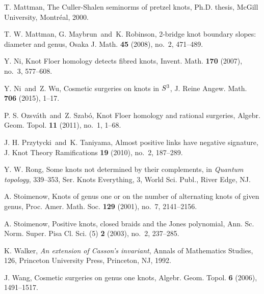 \documentclass{amsart}
\theoremstyle{remark}
\theoremstyle{definition}
\begin{document}
\begin{thebibliography}{99}
T. Mattman,
The Culler-Shalen seminorms of pretzel knots, 
Ph.D. thesis, McGill University, Montr\'eal, 2000.

T. W. Mattman, G. Maybrun\ and\ K. Robinson, 
2-bridge knot boundary slopes: diameter and genus, 
Osaka J. Math. {\bf 45} (2008), no.~2, 471--489. 


Y. Ni, 
Knot Floer homology detects fibred knots, 
Invent. Math. {\bf 170} (2007), no.~3, 577--608. 

Y. Ni\ and\ Z. Wu, 
Cosmetic surgeries on knots in $S\sp 3$, 
J. Reine Angew. Math. {\bf 706} (2015), 1--17. 

P. S. Ozsv\'{a}th\ and\ Z. Szab\'{o}, 
Knot Floer homology and rational surgeries, 
Algebr. Geom. Topol. {\bf 11} (2011), no.~1, 1--68.


J. H. Przytycki\ and\ K. Taniyama, 
Almost positive links have negative signature, 
J. Knot Theory Ramifications {\bf 19} (2010), no.~2, 187--289. 

Y. W. Rong, 
Some knots not determined by their complements, 
in {\it Quantum topology}, 339--353, 
Ser. Knots Everything, 3, World Sci. Publ., River Edge, NJ. 

A. Stoimenow, 
Knots of genus one or on the number of alternating knots of given genus, 
Proc. Amer. Math. Soc. {\bf 129} (2001), no.~7, 2141--2156. 

A. Stoimenow, 
Positive knots, closed braids and the Jones polynomial, 
Ann. Sc. Norm. Super. Pisa Cl. Sci. (5) {\bf 2} (2003), no.~2, 237--285. 

K. Walker, 
{\it An extension of Casson's invariant}, 
Annals of Mathematics Studies, 126, Princeton University Press, Princeton, NJ, 1992. 

J. Wang, 
Cosmetic surgeries on genus one knots, 
Algebr. Geom. Topol. {\bf 6} (2006), 1491--1517. 

\end{thebibliography}
\end{document}

